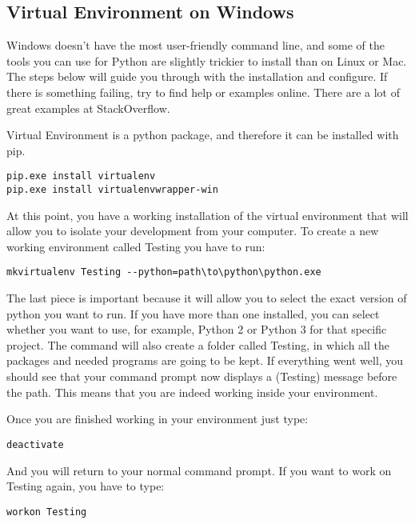 \subsection{Virtual Environment on Windows}

Windows doesn’t have the most user-friendly command line, and some of the tools you can use for Python are slightly trickier to install than on Linux or Mac. The steps below will guide you through with the installation and configure. If there is something failing, try to find help or examples online. There are a lot of great examples at StackOverflow.

Virtual Environment is a python package, and therefore it can be installed with pip.

\begin{verbatim}
pip.exe install virtualenv
pip.exe install virtualenvwrapper-win
\end{verbatim}

At this point, you have a working installation of the virtual environment that will allow you to isolate your development from your computer. To create a new working environment called Testing you have to run:

\begin{verbatim}
mkvirtualenv Testing --python=path\to\python\python.exe
\end{verbatim}

The last piece is important because it will allow you to select the exact version of python you want to run. If you have more than one installed, you can select whether you want to use, for example, Python 2 or Python 3 for that specific project. The command will also create a folder called Testing, in which all the packages and needed programs are going to be kept. If everything went well, you should see that your command prompt now displays a (Testing) message before the path. This means that you are indeed working inside your environment.

Once you are finished working in your environment just type:

\begin{verbatim}
deactivate
\end{verbatim}

And you will return to your normal command prompt. If you want to work on Testing again, you have to type:

\begin{verbatim}
workon Testing
\end{verbatim}

